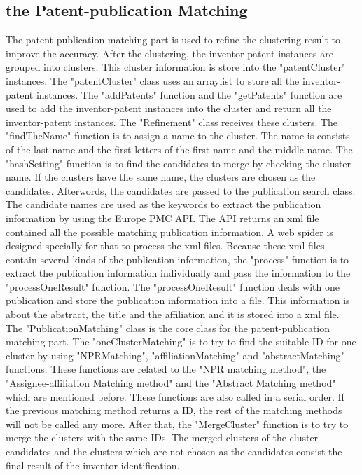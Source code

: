 \subsection{the Patent-publication Matching}
The patent-publication matching part is used to refine the clustering result to improve the accuracy. After the clustering, the inventor-patent instances are grouped into clusters. This cluster information is store into the "patentCluster" instances. The "patentCluster" class uses an arraylist to store all the inventor-patent instances. The "addPatents" function and the "getPatents" function are used to add the inventor-patent instances into the cluster and return all the inventor-patent instances. The "Refinement" class receives these clusters. The "findTheName" function is to assign a name to the cluster. The name is consists of the last name and the first letters of the first name and the middle name. The "hashSetting" function is to find the candidates to merge by checking the cluster name. If the clusters have the same name, the clusters are chosen as the candidates. Afterwords, the candidates are passed to the publication search class. The candidate names are used as the keywords to extract the publication information by using the Europe PMC API.  The API returns an xml file contained all the possible matching publication information. A web spider is designed specially for that to process the xml files. Because these xml files contain several kinds of the publication information, the "process" function is to extract the publication information individually and pass the information to the "processOneResult" function. The "processOneResult" function deals with one publication and store the publication information into a file. This information is about the abstract, the title and the affiliation and it is stored into a xml file. The "PublicationMatching" class is the core class for the patent-publication matching part. The "oneClusterMatching" is to try to find the suitable ID for one cluster by using "NPRMatching", "affiliationMatching"  and  "abstractMatching" functions.  These functions are related to the  "NPR matching method", the "Assignee-affiliation Matching method" and the "Abstract Matching method" which are mentioned before. These functions are also called in a serial order. If the previous matching method returns a ID, the rest of the matching methods will not be called any more.  After that, the "MergeCluster" function is to try to merge the clusters with the same IDs. The merged clusters of the cluster candidates and the clusters which are not chosen as the candidates consist the final result of the inventor identification.






